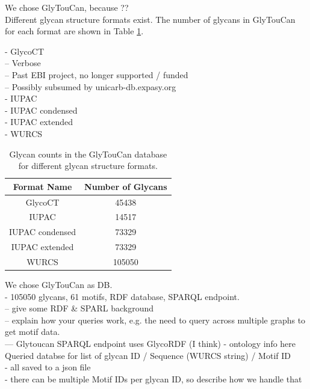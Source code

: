 \documentclass[12pt,a4paper]{article}
\begin{document}
We chose GlyTouCan, because ?? \\

Different glycan structure formats exist. The number of glycans in GlyTouCan for each format are shown in Table \ref{tab:glycan_format_counts}.

- GlycoCT\\
-- Verbose\\
-- Past EBI project, no longer supported / funded\\
-- Possibly subsumed by unicarb-db.expasy.org\\
- IUPAC \\
- IUPAC condensed \\
- IUPAC extended \\
- WURCS \\

\begin{table}[h]
\centering
{}
\begin{tabular}{|c|c|} \hline
{\bf Format Name} & {\bf Number of Glycans} \\ \hline
GlycoCT   &               45438 \\ \hline
IUPAC    &             14517 \\ \hline
IUPAC condensed       &   73329 \\ \hline
IUPAC extended   &           73329 \\ \hline
WURCS   &     105050 \\ \hline
\end{tabular}
\caption{Glycan counts in the GlyTouCan database for different glycan structure formats.}
\label{tab:glycan_format_counts}
\end{table}

We chose GlyTouCan as DB.\\
- 105050 glycans, 61 motifs, RDF database, SPARQL endpoint.\\
-- give some RDF \& SPARL background\\
-- explain how your queries work, e.g. the need to query across multiple graphs to get motif data.\\
--- Glytoucan SPARQL endpoint uses GlycoRDF (I think) - ontology info here  \\

Queried databse for list of glycan ID / Sequence (WURCS string) / Motif ID\\
- all saved to a json file \\
- there can be multiple Motif IDs per glycan ID, so describe how we handle that\\
\end{document}

